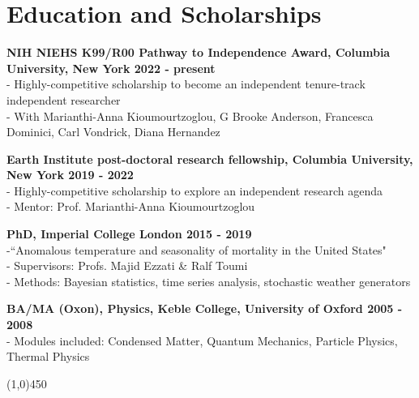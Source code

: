 \section*{Education and Scholarships}

\textbf{NIH NIEHS K99/R00 Pathway to Independence Award, Columbia University, New York \hfill 2022 - present}\\
- Highly-competitive scholarship to become an independent tenure-track independent researcher\\
- With Marianthi-Anna Kioumourtzoglou, G Brooke Anderson, Francesca Dominici, Carl Vondrick, Diana Hernandez\medskip

\noindent \textbf{Earth Institute post-doctoral research fellowship, Columbia University, New York \hfill 2019 - 2022}\\
- Highly-competitive scholarship to explore an independent research agenda\\
- Mentor: Prof. Marianthi-Anna Kioumourtzoglou \medskip

\noindent \textbf{PhD, Imperial College London \hfill 2015 - 2019}\\
-``Anomalous temperature and seasonality of mortality in the United States"\\	 		
- Supervisors: Profs. Majid Ezzati \& Ralf Toumi\\
- Methods: Bayesian statistics, time series analysis, stochastic weather generators\medskip

\noindent \textbf{BA/MA (Oxon), Physics, Keble College, University of Oxford \hfill 2005 - 2008}\\
- Modules included: Condensed Matter,  Quantum Mechanics, Particle Physics, Thermal Physics		                             
\begin{center} \line(1,0){450} \end{center}